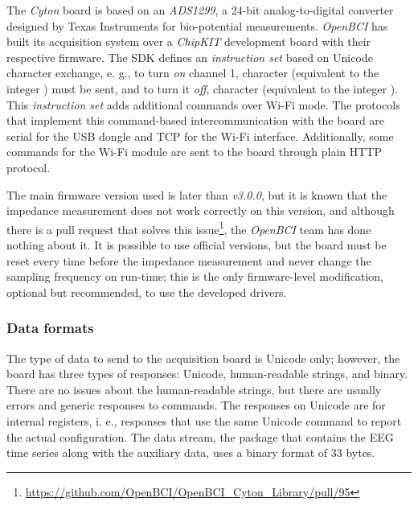 The \textit{Cyton} board is based on an \textit{ADS1299}, a 24-bit analog-to-digital converter designed by Texas Instruments for bio-potential measurements. \textit{OpenBCI} has built its acquisition system over a \textit{ChipKIT} development board with their respective firmware. The \gls*{SDK} defines an \textit{instruction set} based on Unicode character exchange, e. g., to turn \textit{on} channel 1, character  (equivalent to the integer ) must be sent, and to turn it \textit{off}, character  (equivalent to the integer ). This \textit{instruction set} adds additional commands over Wi-Fi mode. The protocols that implement this command-based intercommunication with the board are serial for the USB dongle and \gls*{TCP} for the Wi-Fi interface. Additionally, some commands for the Wi-Fi module are sent to the board through plain HTTP protocol.
 
The main firmware version used is later than \textit{v3.0.0}, but it is known that the impedance measurement does not work correctly on this version, and although there is a pull request that solves this issue\footnote{\href{https://github.com/OpenBCI/OpenBCI_Cyton_Library/pull/95}{https://github.com/OpenBCI/OpenBCI_Cyton_Library/pull/95}}, the \textit{OpenBCI} team has done nothing about it. It is possible to use official versions, but the board must be reset every time before the impedance measurement and never change the sampling frequency on run-time; this is the only firmware-level modification, optional but recommended, to use the developed drivers. 

\subsubsection{Data formats}





The type of data to send to the acquisition board is Unicode only; however, the board has three types of responses: Unicode, human-readable strings, and binary. There are no issues about the human-readable strings, but there are usually errors and generic responses to commands. The responses on Unicode are for internal registers, i. e., responses that use the same Unicode command to report the actual configuration. The data stream, the package that contains the EEG time series along with the auxiliary data, uses a binary format of 33 bytes.

